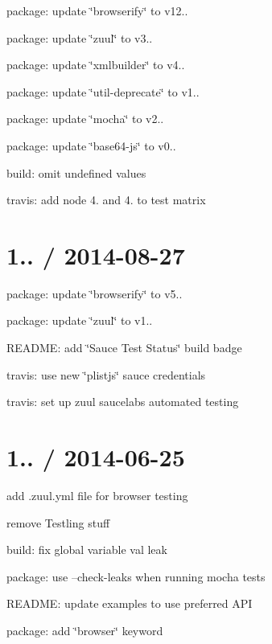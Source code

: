 \begin{DoxyItemize}
\item package\+: update \char`\"{}browserify\char`\"{} to v12..
\item package\+: update \char`\"{}zuul\char`\"{} to v3..
\item package\+: update \char`\"{}xmlbuilder\char`\"{} to v4..
\item package\+: update \char`\"{}util-\/deprecate\char`\"{} to v1..
\item package\+: update \char`\"{}mocha\char`\"{} to v2..
\item package\+: update \char`\"{}base64-\/js\char`\"{} to v0..
\item build\+: omit undefined values
\item travis\+: add node 4. and 4. to test matrix
\end{DoxyItemize}

\section*{1.. / 2014-\/08-\/27 }


\begin{DoxyItemize}
\item package\+: update \char`\"{}browserify\char`\"{} to v5..
\item package\+: update \char`\"{}zuul\char`\"{} to v1..
\item R\+E\+A\+D\+ME\+: add \char`\"{}\+Sauce Test Status\char`\"{} build badge
\item travis\+: use new \char`\"{}plistjs\char`\"{} sauce credentials
\item travis\+: set up zuul saucelabs automated testing
\end{DoxyItemize}

\section*{1.. / 2014-\/06-\/25 }


\begin{DoxyItemize}
\item add .zuul.\+yml file for browser testing
\item remove Testling stuff
\item build\+: fix global variable {\ttfamily val} leak
\item package\+: use --check-\/leaks when running mocha tests
\item R\+E\+A\+D\+ME\+: update examples to use preferred A\+PI
\item package\+: add \char`\"{}browser\char`\"{} keyword
\end{DoxyItemize}


